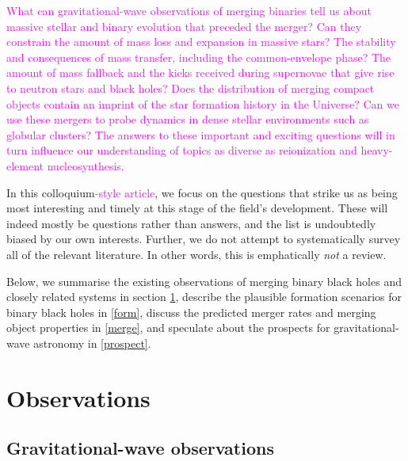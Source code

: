 \documentclass[iop,onecolumn]{revtex4}
\newcommand{\ilya}[1]{\textcolor{magenta}{#1}}
\begin{document}
\ilya{What can gravitational-wave observations of merging binaries tell us about massive stellar and binary evolution that preceded the merger?  Can they constrain the amount of mass loss and expansion in massive stars?  The stability and consequences of mass transfer, including the common-envelope phase?  The amount of mass fallback and the kicks received during supernovae that give rise to neutron stars and black holes?  Does the distribution of merging compact objects contain an imprint of the star formation history in the Universe?    Can we use these mergers to probe dynamics in dense stellar environments such as globular clusters?  The answers to these important and exciting questions will in turn influence our understanding of topics as diverse as reionization and heavy-element nucleosynthesis.}


In this colloquium\ilya{-style article}, we focus on the questions that strike us as being most interesting and timely at this stage of the field's development.  These will indeed mostly be questions rather than answers, and the list is undoubtedly biased by our own interests. Further, we do not attempt to systematically survey all of the relevant literature.  In other words, this is emphatically {\it not} a review. %


Below, we summarise the existing observations of merging binary black holes and closely related systems in section \ref{obs}, describe the plausible formation scenarios for binary black holes in \autoref{form}, discuss the predicted merger rates and merging object properties in \autoref{merge}, and speculate about the prospects for gravitational-wave astronomy in \autoref{prospect}.


 

\section{Observations}\label{obs}

\subsection{Gravitational-wave observations}
\end{document}
